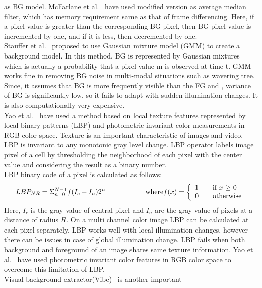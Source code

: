 as BG model. McFarlane et al.~\cite{14} have used modified version as
average median filter, which has memory requirement same as that of
frame differencing. Here, if a pixel value is greater than the
corresponding BG pixel, then BG pixel value is incremented by one, and
if it is less, then decremented by one.\\
\indent Stauffer et al.~\cite{15} proposed to use Gaussian mixture
model (GMM) to create a background model. In this method, BG is
represented by Gaussian mixtures which is actually a probability that a
pixel value m is observed at time t. GMM works fine in removing BG
noise in multi-modal situations such as wavering tree. Since, it assumes
that BG is more frequently visible than the FG and , variance of BG is
significantly low, so it fails to adapt with sudden illumination
changes. It is also computationally very expensive.\\ 
\indent Yao et al.~\cite{11} have used a method based on local texture
features represented by local binary patterns (LBP) and photometric
invariant color measurements in RGB color space. Texture is an important
characteristic of images and video. LBP is invariant to any monotonic
gray level change. LBP operator labels image pixel of a cell by
thresholding the neighborhood of each pixel with the center value and
considering the result as a binary number.\\
\indent LBP binary code of a pixel is calculated as follows:
\begin{equation}
LBP_{NR} = \Sigma _{n = 0} ^{N - 1} f(I_c - I_n) 2^n \hspace{20 mm} \mathrm{where} f(x) = \left\{ 
 \begin{array}{l l}
 1 & \quad \text{if $x$ $\geq$ $0$}\\
 0 & \quad \text{otherwise}
 \end{array} \right.
\end{equation}
\indent Here, $I_c$ is the gray value of central pixel and $I_n$ are the gray
value of pixels at a distance of radius $R$. On a multi channel color
image LBP can be calculated at each pixel separately. LBP works well with
local illumination changes, however there can be issues in case of
global illumination change. LBP fails when both background and foreground
of an image shares same texture information. Yao et al.~\cite{11} have used
photometric invariant color features in RGB color space to overcome this
limitation of LBP.\\
\indent Visual background extractor(Vibe)~\cite{9} is another important
